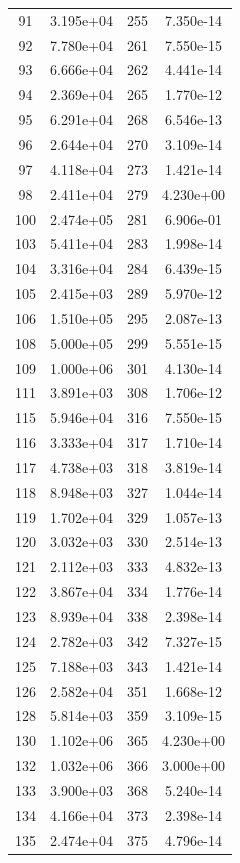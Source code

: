 \documentclass[12pt]{article}
\begin{document}
\begin{longtable}{@{}cccc@{}}
91 & 3.195e+04 & 255 & 7.350e-14 \\
92 & 7.780e+04 & 261 & 7.550e-15 \\
93 & 6.666e+04 & 262 & 4.441e-14 \\
94 & 2.369e+04 & 265 & 1.770e-12 \\
95 & 6.291e+04 & 268 & 6.546e-13 \\
96 & 2.644e+04 & 270 & 3.109e-14 \\
97 & 4.118e+04 & 273 & 1.421e-14 \\
98 & 2.411e+04 & 279 & 4.230e+00 \\
100 & 2.474e+05 & 281 & 6.906e-01 \\
103 & 5.411e+04 & 283 & 1.998e-14 \\
104 & 3.316e+04 & 284 & 6.439e-15 \\
105 & 2.415e+03 & 289 & 5.970e-12 \\
106 & 1.510e+05 & 295 & 2.087e-13 \\
108 & 5.000e+05 & 299 & 5.551e-15 \\
109 & 1.000e+06 & 301 & 4.130e-14 \\
111 & 3.891e+03 & 308 & 1.706e-12 \\
115 & 5.946e+04 & 316 & 7.550e-15 \\
116 & 3.333e+04 & 317 & 1.710e-14 \\
117 & 4.738e+03 & 318 & 3.819e-14 \\
118 & 8.948e+03 & 327 & 1.044e-14 \\
119 & 1.702e+04 & 329 & 1.057e-13 \\
120 & 3.032e+03 & 330 & 2.514e-13 \\
121 & 2.112e+03 & 333 & 4.832e-13 \\
122 & 3.867e+04 & 334 & 1.776e-14 \\
123 & 8.939e+04 & 338 & 2.398e-14 \\
124 & 2.782e+03 & 342 & 7.327e-15 \\
125 & 7.188e+03 & 343 & 1.421e-14 \\
126 & 2.582e+04 & 351 & 1.668e-12 \\
128 & 5.814e+03 & 359 & 3.109e-15 \\
130 & 1.102e+06 & 365 & 4.230e+00 \\
132 & 1.032e+06 & 366 & 3.000e+00 \\
133 & 3.900e+03 & 368 & 5.240e-14 \\
134 & 4.166e+04 & 373 & 2.398e-14 \\
135 & 2.474e+04 & 375 & 4.796e-14 \\

\end{longtable}
\end{document}
